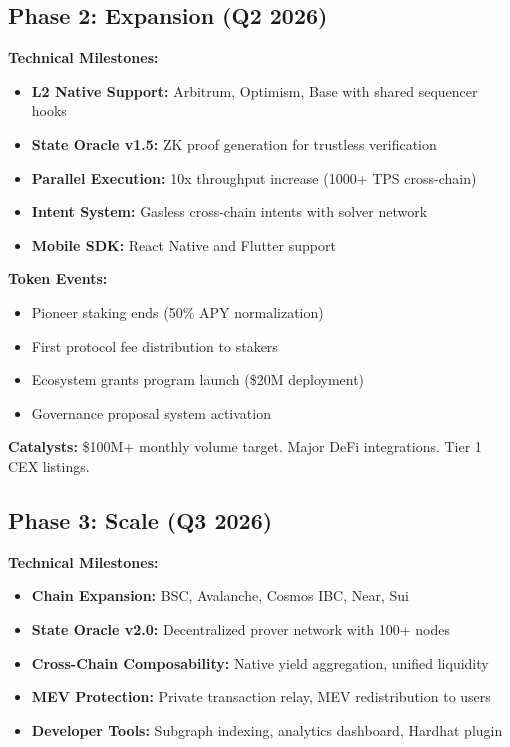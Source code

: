 \documentclass[12pt,a4paper]{article}
\begin{document}
\subsection{Phase 2: Expansion (Q2 2026)}

\textbf{Technical Milestones:}
\begin{itemize}
    \item \textbf{L2 Native Support:} Arbitrum, Optimism, Base with shared sequencer hooks
    \item \textbf{State Oracle v1.5:} ZK proof generation for trustless verification
    \item \textbf{Parallel Execution:} 10x throughput increase (1000+ TPS cross-chain)
    \item \textbf{Intent System:} Gasless cross-chain intents with solver network
    \item \textbf{Mobile SDK:} React Native and Flutter support
\end{itemize}

\textbf{Token Events:}
\begin{itemize}
    \item Pioneer staking ends (50\% APY normalization)
    \item First protocol fee distribution to stakers
    \item Ecosystem grants program launch (\$20M deployment)
    \item Governance proposal system activation
\end{itemize}

\textbf{Catalysts:} \$100M+ monthly volume target. Major DeFi integrations. Tier 1 CEX listings.

\subsection{Phase 3: Scale (Q3 2026)}

\textbf{Technical Milestones:}
\begin{itemize}
    \item \textbf{Chain Expansion:} BSC, Avalanche, Cosmos IBC, Near, Sui
    \item \textbf{State Oracle v2.0:} Decentralized prover network with 100+ nodes
    \item \textbf{Cross-Chain Composability:} Native yield aggregation, unified liquidity
    \item \textbf{MEV Protection:} Private transaction relay, MEV redistribution to users
    \item \textbf{Developer Tools:} Subgraph indexing, analytics dashboard, Hardhat plugin
\end{itemize}
\end{document}
